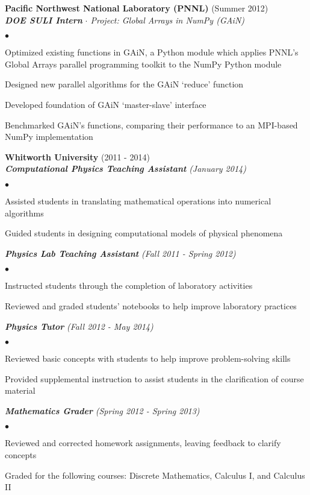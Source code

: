 \documentclass{article}
\newcommand{\employer}[2]{{ \textbf{#1} (#2)\\  }}
\newcommand{\position}[2]{\textbf{\emph{#1}} \emph{#2} \\ }
\newenvironment{worklist}{\begin{list}{$\bullet$}{\topsep 0pt \itemsep -2pt}}{\vspace*{0pt}\end{list}}
\newenvironment{achievements}{\begin{list}{$\bullet$}{\topsep 0pt \itemsep -2pt}}{\vspace*{4pt}\end{list}}
\begin{document}
\employer{Pacific Northwest National Laboratory (PNNL)}{Summer 2012}
\position{DOE SULI Intern}{$\cdot$ Project: Global Arrays in NumPy (GAiN)}
	\begin{achievements}
	\item Optimized existing functions in GAiN, a Python module which applies PNNL's Global Arrays parallel programming toolkit to the NumPy Python module
	\item Designed new parallel algorithms for the GAiN `reduce' function
	\item Developed foundation of GAiN `master-slave' interface
	\item Benchmarked GAiN's functions, comparing their performance to an MPI-based NumPy implementation
	\end{achievements}

\employer{Whitworth University}{2011 - 2014}
\position{Computational Physics Teaching Assistant}{(January 2014)}
	\begin{worklist}
	\item Assisted students in translating mathematical operations into numerical algorithms
	\item Guided students in designing computational models of physical phenomena
	\end{worklist}

\position{Physics Lab Teaching Assistant}{(Fall 2011 - Spring 2012)}
	\begin{worklist}
	\item Instructed students through the completion of laboratory activities
	\item Reviewed and graded students' notebooks to help improve laboratory practices
	\end{worklist}

\position{Physics Tutor}{(Fall 2012 - May 2014)}
	\begin{worklist}
	\item Reviewed basic concepts with students to help improve problem-solving skills
	\item Provided supplemental instruction to assist students in the clarification of course material
	\end{worklist}

\position{Mathematics Grader}{(Spring 2012 - Spring 2013)}
	\begin{worklist}
	\item Reviewed and corrected homework assignments, leaving feedback to clarify concepts
	\item Graded for the following courses: Discrete Mathematics, Calculus I, and Calculus II
	\end{worklist}
\end{document}
